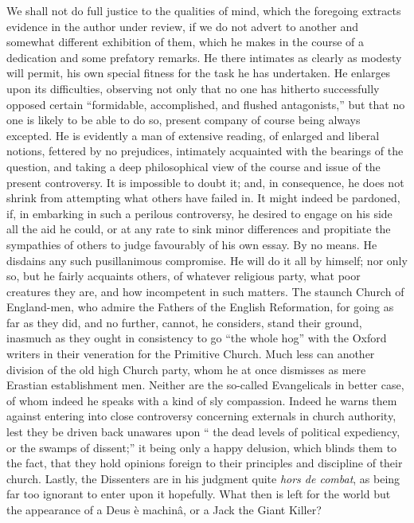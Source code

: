 We shall not do full justice to the qualities of
mind, which the foregoing extracts evidence in the author under review,
if we do not advert to another and somewhat different exhibition of
them, which he makes in the course of a dedication and some prefatory
remarks. He there intimates as clearly as modesty will permit, his own
special fitness for the task he has undertaken. He enlarges upon its
difficulties, observing not only that no one has hitherto successfully
opposed certain ``formidable, accomplished, and flushed antagonists,'' but
that no one is likely to be able to do so, present company of course
being always excepted. He is evidently a man of extensive reading, of
enlarged and liberal notions, fettered by no prejudices, intimately
acquainted with the bearings of the question, and taking a deep
philosophical view of the course and issue of the present controversy.
It is impossible to doubt it; and, in consequence, he does not shrink
from attempting what others have failed in. It might indeed be pardoned,
if, in embarking in such a perilous controversy, he desired to engage on
his side all the aid he could, or at any rate to sink minor differences
and propitiate the sympathies of others to judge favourably of his own
essay. By no means. He disdains any such pusillanimous compromise. He
will do it all by himself; nor only so, but he fairly acquaints others,
of whatever religious party, what poor creatures they are, and how
incompetent in such matters. The staunch Church of England-men,
who admire the Fathers of the English Reformation, for going as far as
they did, and no further, cannot, he considers, stand their ground,
inasmuch as they ought in consistency to go ``the whole hog'' with the
Oxford writers in their veneration for the Primitive Church. Much less
can another division of the old high Church party, whom he at once
dismisses as mere Erastian establishment men. Neither are the so-called
Evangelicals in better case, of whom indeed he speaks with a kind of sly
compassion. Indeed he warns them against entering into close controversy
concerning externals in church authority, lest they be driven back
unawares upon `` the dead levels of political expediency, or the swamps
of dissent;'' it being only a happy delusion, which blinds them to the
fact, that they hold opinions foreign to their principles and discipline
of their church. Lastly, the Dissenters are in his judgment quite \emph{hors
de combat}, as being far too ignorant to enter upon it hopefully.
What then is left for the world but the appearance of a Deus è machinâ,
or a Jack the Giant Killer?

